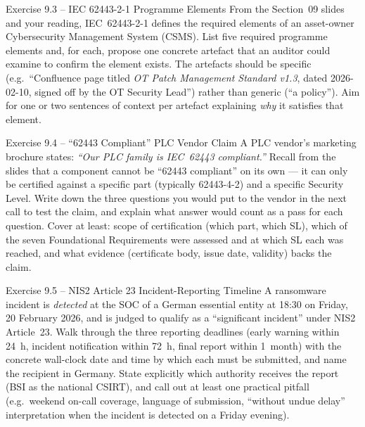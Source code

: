 \documentclass[11pt,a4paper]{article}
\begin{document}
\begin{taskbox}{Exercise 9.3 -- IEC 62443-2-1 Programme Elements}
From the Section~09 slides and your reading, IEC~62443-2-1 defines the required elements of an asset-owner Cybersecurity Management System (CSMS). List five required programme elements and, for each, propose one concrete artefact that an auditor could examine to confirm the element exists. The artefacts should be specific (e.g.\ ``Confluence page titled \emph{OT Patch Management Standard v1.3}, dated 2026-02-10, signed off by the OT Security Lead'') rather than generic (``a policy''). Aim for one or two sentences of context per artefact explaining \emph{why} it satisfies that element.
\end{taskbox}

\begin{taskbox}{Exercise 9.4 -- ``62443 Compliant'' PLC Vendor Claim}
A PLC vendor's marketing brochure states: \emph{``Our PLC family is IEC~62443 compliant.''} Recall from the slides that a component cannot be ``62443 compliant'' on its own --- it can only be certified against a specific part (typically 62443-4-2) and a specific Security Level. Write down the three questions you would put to the vendor in the next call to test the claim, and explain what answer would count as a pass for each question. Cover at least: scope of certification (which part, which SL), which of the seven Foundational Requirements were assessed and at which SL each was reached, and what evidence (certificate body, issue date, validity) backs the claim.
\end{taskbox}

\begin{taskbox}{Exercise 9.5 -- NIS2 Article 23 Incident-Reporting Timeline}
A ransomware incident is \emph{detected} at the SOC of a German essential entity at 18:30 on Friday, 20 February 2026, and is judged to qualify as a ``significant incident'' under NIS2 Article~23. Walk through the three reporting deadlines (early warning within 24~h, incident notification within 72~h, final report within 1~month) with the concrete wall-clock date and time by which each must be submitted, and name the recipient in Germany. State explicitly which authority receives the report (BSI as the national CSIRT), and call out at least one practical pitfall (e.g.\ weekend on-call coverage, language of submission, ``without undue delay'' interpretation when the incident is detected on a Friday evening).
\end{taskbox}
\end{document}
